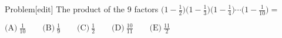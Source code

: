 

Problem[edit]
The product of the 9 factors $\Big(1 - \frac12\Big)\Big(1 - \frac13\Big)\Big(1 - \frac14\Big)\cdots\Big(1 - \frac {1}{10}\Big) =$

$\text{(A)}\ \frac {1}{10} \qquad \text{(B)}\ \frac {1}{9} \qquad \text{(C)}\ \frac {1}{2} \qquad \text{(D)}\ \frac {10}{11} \qquad \text{(E)}\ \frac {11}{2}$
